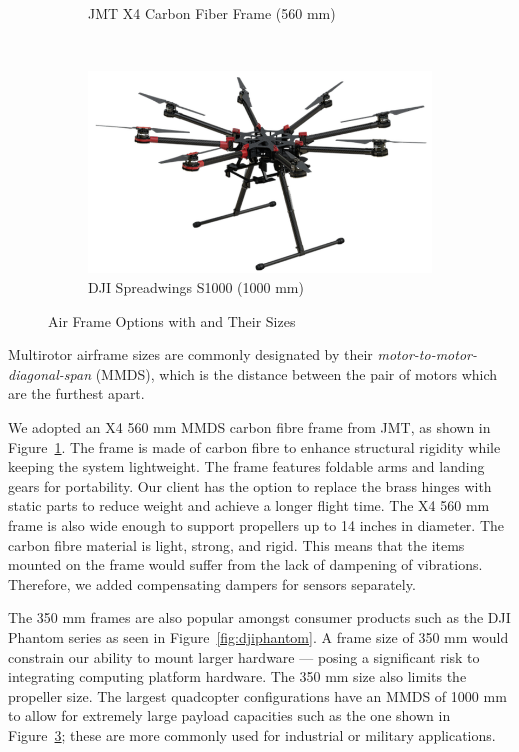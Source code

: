 \begin{figure}[h]
\begin{subfigure}[b]{0.33\textwidth}
		\caption{JMT X4 Carbon Fiber Frame (560 mm)}
		\label{fig:jmtx4}
	\end{subfigure}
	~
	\begin{subfigure}[b]{0.33\textwidth}
		\centering
		\includegraphics[width=\textwidth]{img/djis1000}
		\caption{DJI Spreadwings S1000 (1000 mm)}
		\label{fig:djis1000}
	\end{subfigure}
	
	\caption{Air Frame Options with and Their Sizes }
\end{figure}

Multirotor airframe sizes are commonly designated by their \textit{motor-to-motor-diagonal-span} (MMDS), which is the distance between the pair of motors which are the furthest apart. 

We adopted an X4 560 mm MMDS carbon fibre frame from JMT, as shown in Figure~\ref{fig:jmtx4}. The frame is made of carbon fibre to enhance structural rigidity while keeping the system lightweight. The frame features foldable arms and landing gears for portability. Our client has the option to replace the brass hinges with static parts to reduce weight and achieve a longer flight time. The X4 560 mm frame is also wide enough to support propellers up to 14 inches in diameter. The carbon fibre material is light, strong, and rigid. This means that the items mounted on the frame would suffer from the lack of dampening of vibrations. Therefore, we added compensating dampers for sensors separately.

The 350 mm frames are also popular amongst consumer products such as the DJI Phantom series\cite{dji-phantom-3-specs} as seen in Figure~\ref{fig:djiphantom}. A frame size of 350 mm would constrain our ability to mount larger hardware --- posing a significant risk to integrating computing platform hardware. The 350 mm size also limits the propeller size. The largest quadcopter configurations have an MMDS of 1000 mm to allow for extremely large payload capacities such as the one shown in Figure~\ref{fig:djis1000}; these are more commonly used for industrial or military applications.

